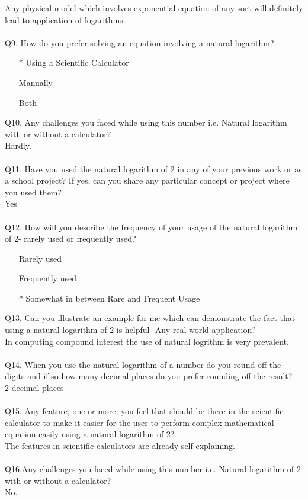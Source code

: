 \documentclass{article}
\makeatletter
\newcommand*{\radiobutton}{%
  \@ifstar{\@radiobutton0}{\@radiobutton1}%
}
\newcommand*{\@radiobutton}[1]{%
  \begin{tikzpicture}
    \pgfmathsetlengthmacro\radius{height("X")/2}
    \draw[radius=\radius] circle;
    \ifcase#1 \fill[radius=.6*\radius] circle;\fi
  \end{tikzpicture}%
}
\makeatother
\begin{document}
Any physical model which involves exponential equation of any sort will definitely lead to application of logarithms.\\\\
Q9. How do you prefer solving an equation involving a natural logarithm?
\begin{itemize}
\item[\radiobutton*] Using a Scientific Calculator
\item[\radiobutton] Manually
\item[\radiobutton] Both
\end{itemize}
Q10. Any challenges you faced while using this number i.e. Natural logarithm with or without a calculator?\\
Hardly.\\\\
Q11. Have you used the natural logarithm of 2 in any of your previous work or as a school project? If yes, can you share any particular concept or project where you used them?\\
Yes\\\\
Q12. How will you describe the frequency of your usage of the natural logarithm of 2- rarely used or frequently used?\\
\begin{itemize}
\item[\radiobutton] Rarely used
\item[\radiobutton] Frequently used
\item[\radiobutton*] Somewhat in between Rare and Frequent Usage
\end{itemize}
Q13. Can you illustrate an example for me which can demonstrate the fact that using a natural logarithm of 2 is helpful- Any real-world application?\\
In computing compound interest the use of natural logrithm is very prevalent.\\\\
Q14. When you use the natural logarithm of a number do you round off the digits and if so how many decimal places do you prefer rounding off the result? \\
2 decimal places\\\\
Q15. Any feature, one or more, you feel that should be there in the scientific calculator to make it easier for the user to perform complex mathematical equation easily using a natural logarithm of 2?\\
The features in scientific calculators are already self explaining.\\\\
Q16.Any challenges you faced while using this number i.e. Natural logarithm of 2 with or without a calculator?\\
No.
\end{document}
